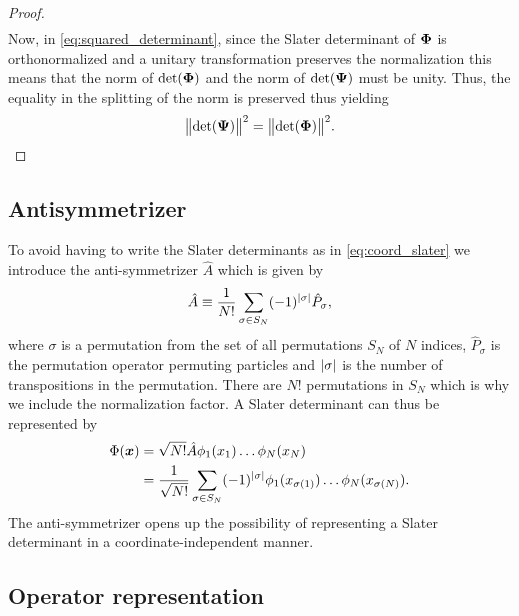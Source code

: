 \begin{proof}
\begin{align}
            \end{align}
            Now, in \autoref{eq:squared_determinant}, since the Slater
            determinant of $\boldsymbol{\Phi}$ is orthonormalized and a unitary
            transformation preserves the normalization this means that the norm
            of $\det(\boldsymbol{\Phi})$ and the norm of $\det(\boldsymbol{\Psi})$ must be
            unity.  Thus, the equality in the splitting of the norm is preserved
            thus yielding
            \begin{gather}
                \norm{\det(\boldsymbol{\Psi})}^2 = \norm{\det(\boldsymbol{\Phi})}^2.
            \end{gather}
        \end{proof}

        \subsection{Antisymmetrizer}
            To avoid having to write the Slater determinants as in
            \autoref{eq:coord_slater} we introduce the anti-symmetrizer
            $\hat{A}$ which is given by
            \begin{align}
                \hat{A}
                \equiv
                \frac{1}{N!}
                \sum_{\sigma \in S_N}
                (-1)^{\abs{\sigma}}
                \hat{P}_{\sigma},
            \end{align}
            where $\sigma$ is a permutation from the set of all permutations
            $S_N$ of $N$ indices, $\hat{P}_{\sigma}$ is the permutation
            operator permuting particles and $\abs{\sigma}$ is the number of
            transpositions in the permutation.
            There are $N!$ permutations in $S_N$ which is why we include the
            normalization factor.
            A Slater determinant can thus be represented by
            \begin{align}
                \Phi(\boldsymbol{x})
                &=
                \sqrt{N!}\hat{A}\phi_1(x_1)\dots\phi_N(x_N)
                \\
                &= \frac{1}{\sqrt{N!}}
                \sum_{\sigma \in S_N} (-1)^{\abs{\sigma}}
                \phi_1(x_{\sigma(1)})\dots\phi_N(x_{\sigma(N)}).
            \end{align}
            The anti-symmetrizer opens up the possibility of representing a
            Slater determinant in a coordinate-independent manner.

        \subsection{Operator representation}

